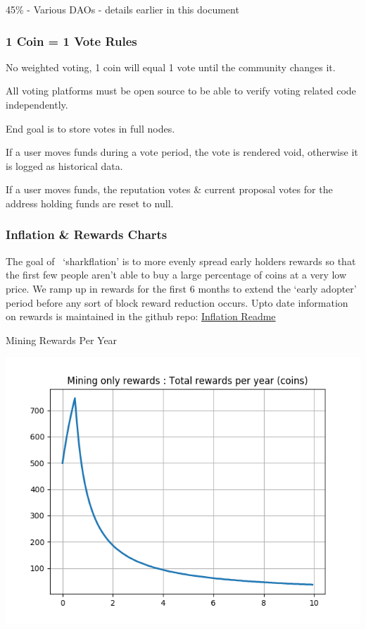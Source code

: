 {45\% - Various DAOs - details earlier in this document}

\hypertarget{h.q7vhblr4zovd}{%
\subsubsection{\texorpdfstring{{1 Coin = 1 Vote
Rules}}{1 Coin = 1 Vote Rules}}\label{h.q7vhblr4zovd}}

{No weighted voting, 1 coin will equal 1 vote until the community
changes it.}

{All voting platforms must be open source to be able to verify voting
related code independently.}

{End goal is to store votes in full nodes.}

{If a user moves funds during a vote period, the vote is rendered void,
otherwise it is logged as historical data.}

{If a user moves funds, the reputation votes \& current proposal votes
for the address holding funds are reset to null.}

{}

\hypertarget{h.9wa3ij7ozra8}{%
\subsubsection{\texorpdfstring{{In}{flation \& Rewards
Charts}}{Inflation \& Rewards Charts}}\label{h.9wa3ij7ozra8}}

{The goal of ~`sharkflation' is to more evenly spread early holders
rewards so that the first few people aren't able to buy a large
percentage of coins at a very low price. We ramp up in rewards for the
first 6 months to extend the `early adopter' period before any sort of
block reward reduction occurs. Upto date information on rewards is
maintained in the github repo:
}{\href{https://www.google.com/url?q=https://github.com/devaultcrypto/devault/blob/develop/INFLATION.md\&sa=D\&ust=1574537005310000}{Inflation
Readme}}

{}

{}

{Mining Rewards Per Year}

{\includegraphics{images/image2.png}}{~}

